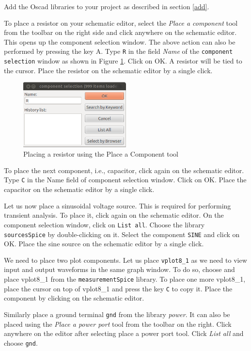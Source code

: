 Add the Oscad libraries to your project as described in section \ref{add}.

To place a resistor on your schematic editor, select the \textit{Place a component} tool from the toolbar on the right side and click anywhere on the schematic editor. This opens up the component selection window. The above action can also be performed by pressing the key A. Type {\tt R} in the field \textit{Name} of the {\tt component selection} window as shown in Figure \ref{res}. Click on OK. A resistor will be tied to the cursor. Place the resistor on the schematic editor by a single click.

\begin{figure}
\centering
\includegraphics[width=0.5\textwidth]{figures/comp}
\caption{Placing a resistor using the Place a Component tool}
\label{res}
\end{figure}
To place the next component, i.e., capacitor, click again on the schematic editor. Type {\tt C} in the Name field of component selection window. Click on OK. Place the capacitor on the schematic editor by a single click.

Let us now place a sinusoidal voltage source. This is required for performing transient analysis. To place it, click again on the schematic editor. On the component selection window, click on {\tt List all}. Choose the library {\tt sourcesSpice} by double-clicking on it. Select the component {\tt SINE} and click on OK. Place the sine source on the schematic editor by a single click.

We need to place two plot components. Let us place {\tt vplot8\_1} as we need to view input and output waveforms in the same graph window. To do so, choose and place vplot8\_1 from the {\tt measurementSpice} library. To place one more vplot8\_1, place the cursor on top of vplot8\_1 and press the key {\tt C} to copy it. Place the component by clicking on the schematic editor.

Similarly place a ground terminal {\tt gnd} from the library \textit{power}. It can also be placed using the \textit{Place a power port} tool from the toolbar on the right. Click anywhere on the editor after selecting place a power port tool. Click \textit{List all} and choose {\tt gnd}.

